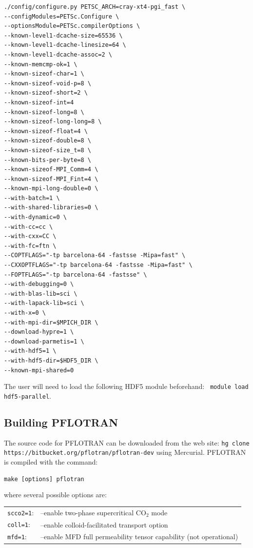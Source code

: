 \documentclass[12pt]{article}
\begin{document}
\footnotesize
\begin{verbatim}
./config/configure.py PETSC_ARCH=cray-xt4-pgi_fast \
--configModules=PETSc.Configure \
--optionsModule=PETSc.compilerOptions \
--known-level1-dcache-size=65536 \
--known-level1-dcache-linesize=64 \
--known-level1-dcache-assoc=2 \
--known-memcmp-ok=1 \
--known-sizeof-char=1 \
--known-sizeof-void-p=8 \
--known-sizeof-short=2 \
--known-sizeof-int=4
--known-sizeof-long=8 \
--known-sizeof-long-long=8 \
--known-sizeof-float=4 \
--known-sizeof-double=8 \
--known-sizeof-size_t=8 \
--known-bits-per-byte=8 \
--known-sizeof-MPI_Comm=4 \
--known-sizeof-MPI_Fint=4 \
--known-mpi-long-double=0 \
--with-batch=1 \
--with-shared-libraries=0 \
--with-dynamic=0 \
--with-cc=cc \
--with-cxx=CC \
--with-fc=ftn \
--COPTFLAGS="-tp barcelona-64 -fastsse -Mipa=fast" \
--CXXOPTFLAGS="-tp barcelona-64 -fastsse -Mipa=fast" \
--FOPTFLAGS="-tp barcelona-64 -fastsse" \
--with-debugging=0 \
--with-blas-lib=sci \
--with-lapack-lib=sci \
--with-x=0 \
--with-mpi-dir=$MPICH_DIR \
--download-hypre=1 \
--download-parmetis=1 \
--with-hdf5=1 \
--with-hdf5-dir=$HDF5_DIR \
--known-mpi-shared=0
\end{verbatim}
\normalsize
The user will need to load the following HDF5 module beforehand: \ \verb|module load hdf5-parallel|.

\subsection{Building PFLOTRAN}

The source code for PFLOTRAN can be downloaded from the web site: \verb|hg clone https://bitbucket.org/pflotran/pflotran-dev| using Mercurial. 
PFLOTRAN is compiled with the command:

\verb|make [options] pflotran|

\noindent
where several possible options are: 

\begin{tabular}{ll}
\verb|scco2=1|: & --enable two-phase supercritical CO$_2$ mode\\
\verb|coll=1|: & --enable colloid-facilitated transport option\\
\verb|mfd=1|: & --enable MFD full permeability tensor capability (not operational)
\end{tabular}
\end{document}

